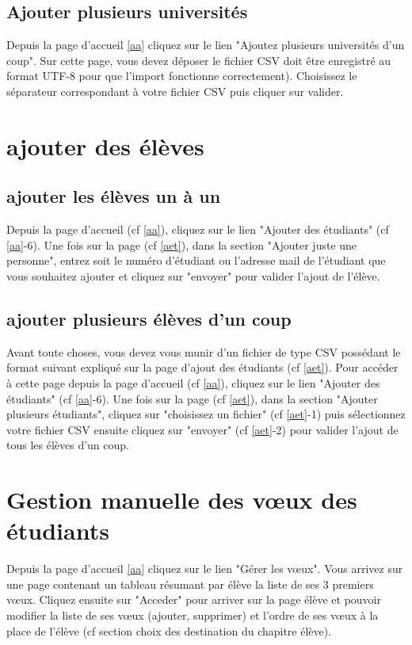 \subsection{Ajouter plusieurs universités} 
\label{au}

Depuis la page d'accueil \ref{aa} cliquez sur le lien "Ajoutez plusieurs universités d'un coup". Sur cette page, vous devez déposer le fichier CSV doit être enregistré au format UTF-8 pour que l'import fonctionne correctement). Choisissez le séparateur correspondant à votre fichier CSV puis cliquer sur valider.

\section{ajouter des élèves}
\label{ael}

\subsection{ajouter les élèves un à un}
Depuis la page d'accueil (cf \ref{aa}), cliquez sur le lien "Ajouter des étudiants" (cf \ref{aa}-6). Une fois sur la page (cf \ref{aet}), dans la section "Ajouter juste une personne", entrez soit le numéro d'étudiant ou l'adresse mail de l'étudiant que vous souhaitez ajouter et cliquez sur "envoyer" pour valider l'ajout de l'élève.

\subsection{ajouter plusieurs élèves d'un coup}
Avant toute choses, vous devez vous munir d'un fichier de type CSV possédant le format suivant expliqué sur la page d'ajout des étudiants (cf \ref{aet}).
Pour accéder à cette page depuis la page d'accueil (cf \ref{aa}), cliquez sur le lien "Ajouter des étudiants" (cf \ref{aa}-6). Une fois sur la page (cf \ref{aet}), dans la section "Ajouter plusieurs étudiants", cliquez sur "choisissez un fichier" (cf \ref{aet}-1) puis sélectionnez votre fichier CSV ensuite cliquez sur "envoyer" (cf \ref{aet}-2) pour valider l'ajout de tous les élèves d'un coup. 

\section{Gestion manuelle des vœux des étudiants}

Depuis la page d'accueil \ref{aa} cliquez sur le lien "Gérer les vœux". Vous arrivez sur une page contenant un tableau résumant par élève la liste de ses 3 premiers vœux. Cliquez ensuite sur "Acceder" pour arriver sur la page élève et pouvoir modifier la liste de ses vœux (ajouter, supprimer) et l'ordre de ses vœux à la place de l'élève (cf section choix des destination du chapitre élève).


